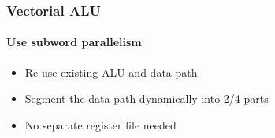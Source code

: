\documentclass{beamer}
\begin{document}
\begin{frame}
  \frametitle{Vectorial ALU}
  \framesubtitle{Use subword parallelism}
  \begin{itemize}
    \item Re-use existing ALU and data path
    \item Segment the data path dynamically into 2/4 parts
    \item No separate register file needed
  \end{itemize}
  \vfill
\end{frame}
\end{document}
